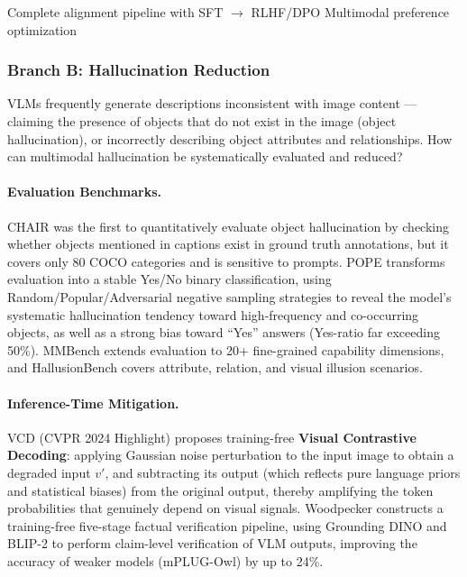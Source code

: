   {Complete alignment pipeline with SFT $\rightarrow$ RLHF/DPO}
  {Multimodal preference optimization}

\subsubsection{Branch B: Hallucination Reduction}
\label{sec:t5-branch-b}

\begin{problembox}
VLMs frequently generate descriptions inconsistent with image content --- claiming the presence of objects that do not exist in the image (object hallucination),
or incorrectly describing object attributes and relationships.
How can multimodal hallucination be systematically evaluated and reduced?
\end{problembox}

\paragraph{Evaluation Benchmarks.}
CHAIR \cite{rohrbach2018chair} was the first to quantitatively evaluate object hallucination
by checking whether objects mentioned in captions exist in ground truth annotations,
but it covers only 80 COCO categories and is sensitive to prompts.
POPE \cite{li2023pope} transforms evaluation into a stable Yes/No binary classification,
using Random/Popular/Adversarial negative sampling strategies to reveal
the model's systematic hallucination tendency toward high-frequency and co-occurring objects,
as well as a strong bias toward ``Yes'' answers (Yes-ratio far exceeding 50\%).
MMBench \cite{liu2023mmbench} extends evaluation to 20+ fine-grained capability dimensions,
and HallusionBench \cite{guan2023hallusionbench} covers attribute, relation, and visual illusion scenarios.

\paragraph{Inference-Time Mitigation.}
VCD \cite{leng2023vcd} (CVPR 2024 Highlight) proposes training-free \textbf{Visual Contrastive Decoding}:
applying Gaussian noise perturbation to the input image to obtain a degraded input $v'$,
and subtracting its output (which reflects pure language priors and statistical biases) from the original output,
thereby amplifying the token probabilities that genuinely depend on visual signals.
Woodpecker \cite{yin2023woodpecker} constructs a training-free five-stage factual verification pipeline,
using Grounding DINO and BLIP-2 to perform claim-level verification of VLM outputs,
improving the accuracy of weaker models (mPLUG-Owl) by up to 24\%.

